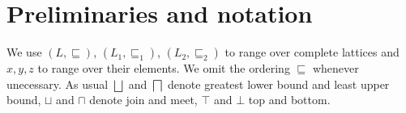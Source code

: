 \documentclass{llncs}
\begin{document}
%
%
%
%


\section{Preliminaries and notation}
%
We use $(L,\sqsubseteq)$, $(L_1,\sqsubseteq_1)$, $(L_2,\sqsubseteq_2)$ to range over complete lattices and $x,y,z$ to range over their elements. We omit the ordering $\sqsubseteq$ whenever unecessary. As usual $\bigsqcup$ and $\bigsqcap$ denote greatest lower bound and least upper bound, $\sqcup$ and $\sqcap$ denote join and meet, $\top$ and $\bot$ top and bottom.
\end{document}
